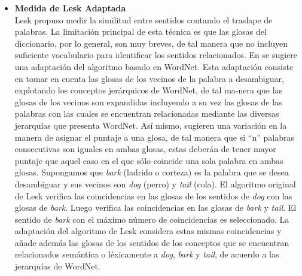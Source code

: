 \begin{itemize}
  \item \textbf{Medida de Lesk Adaptada}\\
    Lesk propuso medir la similitud entre sentidos contando el traslape de palabras. La limitación principal de esta técnica es que las glosas del diccionario, por lo general, son muy breves, de tal manera que no incluyen suficiente vocabulario para identificar los sentidos relacionados. En \cite{006} se sugiere una adaptación del algoritmo basado en WordNet. Esta adaptación consiste en tomar en cuenta las glosas de los vecinos de la palabra a desambiguar, explotando los conceptos jerárquicos de WordNet, de tal ma-nera que las glosas de los vecinos son expandidas incluyendo a su vez las glosas de las palabras con las cuales se encuentran relacionadas mediante las diversas jerarquías que presenta WordNet. Así mismo, sugieren una variación en la manera de asignar el puntaje a una glosa, de tal manera que si “n” palabras consecutivas son iguales en ambas glosas, estas deberán de tener mayor puntaje que aquel caso en el que sólo coincide una sola palabra en ambas glosas.
    Supongamos que \textit{bark} (ladrido o corteza) es la palabra que se desea desambiguar y sus vecinos son \textit{dog} (perro) y \textit{tail} (cola). El algoritmo original de Lesk verifica las coincidencias en las glosas de los sentidos de \textit{dog} con las glosas de \textit{bark}. Luego verifica las coincidencias en las glosas de \textit{bark} y \textit{tail}. El sentido de \textit{bark} con el máximo número de coincidencias es seleccionado. La adaptación del algoritmo de Lesk considera estas mismas coincidencias y añade además las glosas de los sentidos de los conceptos que se encuentran relacionados semántica o léxicamente a \textit{dog}, \textit{bark} y \textit{tail}, de acuerdo a las jerarquías de WordNet.
\end{itemize}

